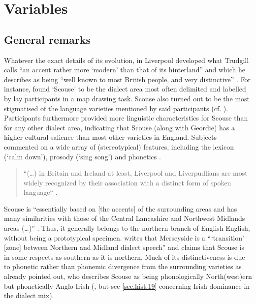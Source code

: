 \chapter{Variables}
\label{ch.var}

	\section{General remarks}\label{sec.var.general}

Whatever the exact details of its evolution, in Liverpool developed what Trudgill calls ``an accent rather more `modern' than that of its hinterland'' and which he describes as being ``well known to most British people, and very distinctive'' \citep[70]{trudgill1999}.
For instance, \citeauthor{montgomery2007} found `Scouse' to be the dialect area most often delimited and labelled by lay participants in a map drawing task.
Scouse also turned out to be the most stigmatised of the language varieties mentioned by said participants (cf. \citeyear[194 and 254]{montgomery2007}).
Participants furthermore provided more linguistic characteristics for Scouse than for any other dialect area, indicating that Scouse (along with Geordie) has a higher cultural salience than most other varieties in England.
Subjects commented on a wide array of (stereotypical) features, including the lexicon (`calm down'), prosody (`sing song') and phonetics \citep[cf.][180--181]{montgomery2007a}.
	\begin{quote}
		``(\dots) in Britain and Ireland at least, Liverpool and Liverpudlians are most widely recognized by their association with a distinct form of spoken language`` \citep[15]{crowley2012}.
	\end{quote}
Scouse is ``essentially based on [the accents] of the surrounding areas and has many similarities with those of the Central Lancashire and Northwest Midlands areas (\dots)'' \citep[70]{trudgill1999}.
Thus, it generally belongs to the northern branch of English English, without being a prototypical specimen.
\citet[18]{wales2006} writes that Merseyside is a ```transition' [zone] between Northern and Midland dialect speech'' and \citet[72]{trudgill1999} claims that Scouse is in some respects as southern as it is northern.
Much of its distinctiveness is due to phonetic rather than phonemic divergence from the surrounding varieties as \citet{knowles1973} already pointed out, who describes Scouse as being phonologically North(west)ern but phonetically Anglo Irish (\citealt[cf. also][80]{knowles1978}, but see \ref{sec.hist.19} concerning Irish dominance in the dialect mix).

